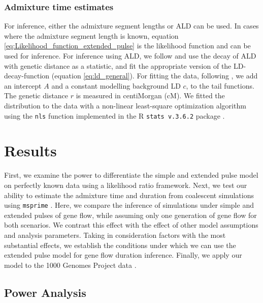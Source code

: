 \documentclass[11pt]{article}
\begin{document}
\subsubsection{Admixture time estimates}\label{admixture time estimates}
For inference, either the admixture segment lengths or ALD can be used. In cases where the admixture segment length is known, equation \ref{eq:Likelihood_function_extended_pulse} is the likelihood function and can be used for inference. For inference using ALD,  we follow \cite{moorjani_history_2011} and use the decay of ALD with genetic distance as a statistic, and fit the appropriate version of the LD-decay-function (equation \ref{eq:ld_general}). For fitting the data, following \cite{moorjani_genetic_2016}, we add an intercept $A$ and a constant modelling background LD $c$, to the tail functions. The genetic distance $r$ is measured in centiMorgan (cM). We fitted the distribution to the data with  a non-linear least-square optimization algorithm using the \texttt{nls} function implemented in the R \texttt{stats v.3.6.2} package \citep{R_Core_Team_2019}.

\section{Results}\label{results}


First, we examine the power to differentiate the simple and extended pulse model on perfectly known data using a likelihood ratio framework. Next, we test our ability to estimate the admixture time and duration from coalescent simulations using \texttt{msprime} \citep{kelleher_efficient_2016}. Here, we compare the inference of simulations under simple and extended pulses of gene flow, while assuming only one generation of gene flow for both scenarios. We contrast this effect with the effect of other model assumptions and analysis parameters. Taking in consideration factors with the most substantial effects, we establish the conditions under which we can use the extended pulse model for gene flow duration inference. Finally, we apply our model to the 1000 Genomes Project data \citep{the_1000_genomes_project_consortium_global_2015}.

\subsection{Power Analysis}\label{Power Analysis}
\end{document}
